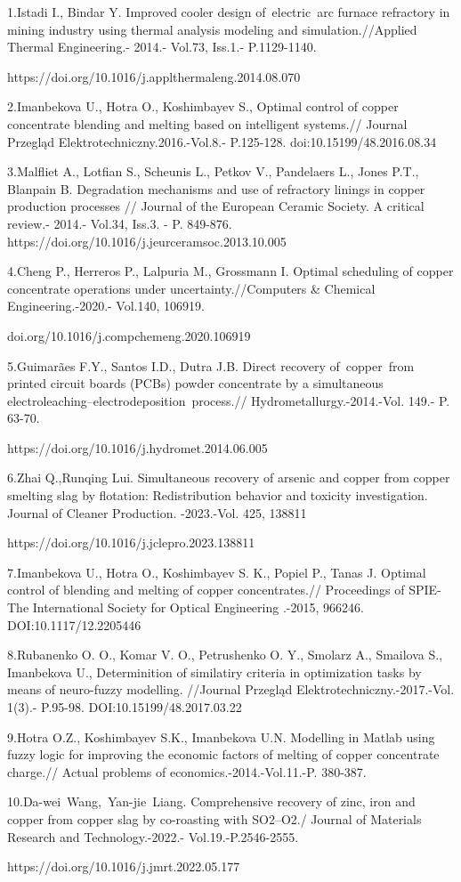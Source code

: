 \begin{noparindent}
1.Istadi I., Bindar Y. Improved cooler design of~electric~arc furnace
refractory in mining industry using thermal analysis modeling and
simulation.//Applied Thermal Engineering.- 2014.- Vol.73, Iss.1.-
P.1129-1140.

https://doi.org/10.1016/j.applthermaleng.2014.08.070

2.Imanbekova U., Hotra O., Koshimbayev S., Optimal control of copper
concentrate blending and melting based on intelligent systems.// Journal
Przegląd Elektrotechniczny.2016.-Vol.8.- P.125-128.
doi:10.15199/48.2016.08.34

3.Malfliet A., Lotfian S., Scheunis L., Petkov V., Pandelaers L., Jones
P.T., Blanpain B. Degradation mechanisms and use of refractory linings
in copper production processes // Journal of the European Ceramic
Society. A critical review.- 2014.- Vol.34, Iss.3. - P. 849-876.
https://doi.org/10.1016/j.jeurceramsoc.2013.10.005

4.Cheng P., Herreros P., Lalpuria M., Grossmann I. Optimal scheduling of
copper concentrate operations under uncertainty.//Computers \& Chemical
Engineering.-2020.- Vol.140, 106919.

doi.org/10.1016/j.compchemeng.2020.106919

5.Guimarães F.Y., Santos I.D., Dutra J.B. Direct recovery of~copper~from
printed circuit boards (PCBs) powder concentrate by a simultaneous
electroleaching--electrodeposition~process.//
Hydrometallurgy.-2014.-Vol. 149.- P. 63-70.

https://doi.org/10.1016/j.hydromet.2014.06.005

6.Zhai Q.,Runqing Lui. Simultaneous recovery of arsenic and copper from
copper smelting slag by flotation: Redistribution behavior and toxicity
investigation. Journal of Cleaner Production. -2023.-Vol. 425, 138811

https://doi.org/10.1016/j.jclepro.2023.138811

7.Imanbekova U., Hotra O., Koshimbayev S. K., Popiel P., Tanas J.
Optimal control of blending and melting of copper concentrates.//
Proceedings of SPIE-The International Society for Optical Engineering
.-2015, 966246. DOI:10.1117/12.2205446

8.Rubanenko O. O., Komar V. O., Petrushenko O. Y., Smolarz A., Smailova
S., Imanbekova U., Determinition of similatiry criteria in optimization
tasks by means of neuro-fuzzy modelling. //Journal Przegląd
Elektrotechniczny.-2017.-Vol. 1(3).- P.95-98. DOI:10.15199/48.2017.03.22

9.Hotra O.Z., Koshimbayev S.K., Imanbekova U.N. Modelling in Matlab
using fuzzy logic for improving the economic factors of melting of
copper concentrate charge.// Actual problems of
economics.-2014.-Vol.11.-P. 380-387.

10.Da-wei~Wang,~Yan-jie~Liang. Comprehensive recovery of zinc, iron and
copper from copper slag by co-roasting with SO2--O2./ Journal of
Materials Research and Technology.-2022.- Vol.19.-P.2546-2555.

https://doi.org/10.1016/j.jmrt.2022.05.177
\end{noparindent}

